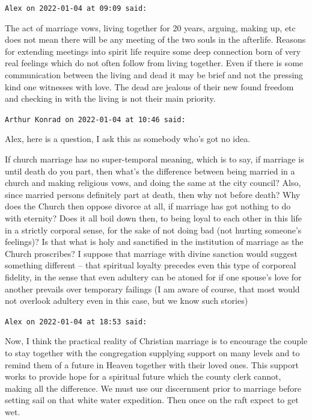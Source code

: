\begin{footnotesize}\begin{sffamily}



\texttt{Alex on 2022-01-04 at 09:09 said: }

The act of marriage vows, living together for 20 years, arguing, making up, etc does not mean there will be any meeting of the two souls in the afterlife. Reasons for extending meetings into spirit life require some deep connection born of very real feelings which do not often follow from living together. Even if there is some communication between the living and dead it may be brief and not the pressing kind one witnesses with love. The dead are jealous of their new found freedom and checking in with the living is not their main priority.


\hfill

\texttt{Arthur Konrad on 2022-01-04 at 10:46 said: }

Alex, here is a question, I ask this as somebody who's got no idea.

If church marriage has no super-temporal meaning, which is to say, if marriage is until death do you part, then what's the difference between being married in a church and making religious vows, and doing the same at the city council? Also, since married persons definitely part at death, then why not before death? Why does the Church then oppose divorce at all, if marriage has got nothing to do with eternity? Does it all boil down then, to being loyal to each other in this life in a strictly corporal sense, for the sake of not doing bad (not hurting someone's feelings)? Is that what is holy and sanctified in the institution of marriage as the Church proscribes? I suppose that marriage with divine sanction would suggest something different – that spiritual loyalty precedes even this type of corporeal fidelity, in the sense that even adultery can be atoned for if one spouse's love for another prevails over temporary failings (I am aware of course, that most would not overlook adultery even in this case, but we know such stories)


\hfill

\texttt{Alex on 2022-01-04 at 18:53 said: }

Now, I think the practical reality of Christian marriage is to encourage the couple to stay together with the congregation supplying support on many levels and to remind them of a future in Heaven together with their loved ones. This support works to provide hope for a spiritual future which the county clerk cannot, making all the difference. We must use our discernment prior to marriage before setting sail on that white water expedition. Then once on the raft expect to get wet.


\end{sffamily}\end{footnotesize}
